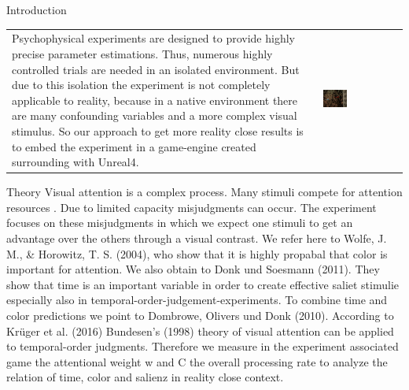 \documentclass[a0paper,portrait]{baposter}
\begin{document}
\begin{poster}
{		}
		
		
		
		\begin{posterbox}[name=intro,span=2,column=0,row=0]{Introduction}
			\begin{tabular}{p{} p{}}
				Psychophysical experiments are designed to provide highly precise parameter estimations. Thus, numerous highly controlled trials are needed in an isolated environment. But due to this isolation the experiment is not completely applicable to reality, because in a native environment there are many confounding variables and a more complex visual stimulus.
				So our approach to get more reality close results is to embed the experiment in a game-engine created surrounding with Unreal4.
				& 
				\vspace{-8pt}
				\includegraphics[width=0.32\textwidth]{race2.png}\\
			\end{tabular}
			
		\end{posterbox}
		
		\begin{posterbox}[name=theory,column=0,row=1,below=intro]{Theory}
			Visual attention is a complex process. Many stimuli compete for attention resources . Due to limited capacity misjudgments can occur. The experiment focuses on these misjudgments in which we expect one stimuli to get an advantage over the others through a visual contrast. We refer here to Wolfe, J. M., \& Horowitz, T. S. (2004), who show that it is highly propabal that color is important for attention. We also obtain to Donk und Soesmann (2011). They show that time is an important variable in order to create effective saliet stimulie especially also in temporal-order-judgement-experiments. To combine time and color predictions we point to Dombrowe, Olivers und Donk (2010). According to Krüger et al. (2016) Bundesen's (1998) theory of visual attention can be applied to temporal-order judgments. Therefore we measure in the experiment associated game the attentional weight w and C the overall processing rate to analyze the relation of time, color and salienz in reality close context. 
		\end{posterbox}
		

\end{poster}
\end{document}
